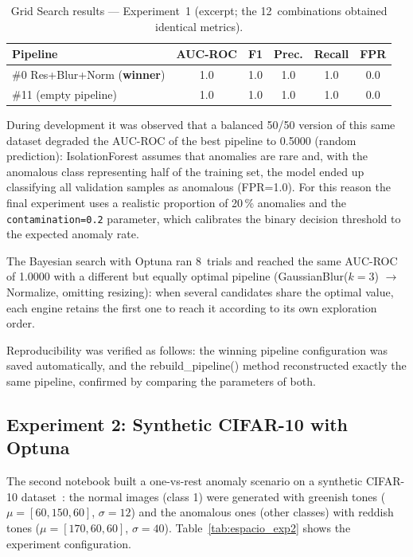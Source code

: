 \documentclass[conference]{IEEEtran}
\begin{document}
\begin{table}[t]
\centering
\renewcommand{\arraystretch}{1.2}
\caption{Grid Search results — Experiment~1 (excerpt; the
  12~combinations obtained identical metrics).}
\label{tab:metricas_exp1}
\begin{tabular}{@{}lccccc@{}}
\toprule
\textbf{Pipeline} & \textbf{AUC-ROC} & \textbf{F1} & \textbf{Prec.} &
\textbf{Recall} & \textbf{FPR} \\
\midrule
\#0 Res+Blur+Norm (\textbf{winner}) & 1.0 & 1.0 & 1.0 & 1.0 & 0.0 \\
\#11 (empty pipeline)                            & 1.0 & 1.0 & 1.0 & 1.0 & 0.0 \\
\bottomrule
\end{tabular}
\end{table}

During development it was observed that a balanced 50/50 version of this same
dataset degraded the AUC-ROC of the best pipeline to 0.5000 (random
prediction): IsolationForest assumes that anomalies are rare and, with the
anomalous class representing half of the training set, the model ended up
classifying all validation samples as anomalous (FPR=1.0). For this reason the
final experiment uses a realistic proportion of 20\,\% anomalies and the
\texttt{contamination=0.2} parameter, which calibrates the binary decision
threshold to the expected anomaly rate.

The Bayesian search with Optuna ran 8~trials and reached the same AUC-ROC of
1.0000 with a different but equally optimal pipeline (GaussianBlur($k=3$) $\to$
Normalize, omitting resizing): when several candidates share the optimal value,
each engine retains the first one to reach it according to its own exploration
order.

Reproducibility was verified as follows: the winning pipeline configuration was
saved automatically, and the rebuild\_pipeline() method reconstructed exactly
the same pipeline, confirmed by comparing the parameters of both.

\subsection{Experiment 2: Synthetic CIFAR-10 with Optuna}

The second notebook built a one-vs-rest anomaly scenario on a synthetic
CIFAR-10 dataset~\cite{krizhevsky2009cifar}: the normal images (class 1) were
generated with greenish tones ($\mu=[60,150,60]$, $\sigma=12$) and the
anomalous ones (other classes) with reddish tones ($\mu=[170,60,60]$,
$\sigma=40$). Table~\ref{tab:espacio_exp2} shows the experiment configuration.
\end{document}
